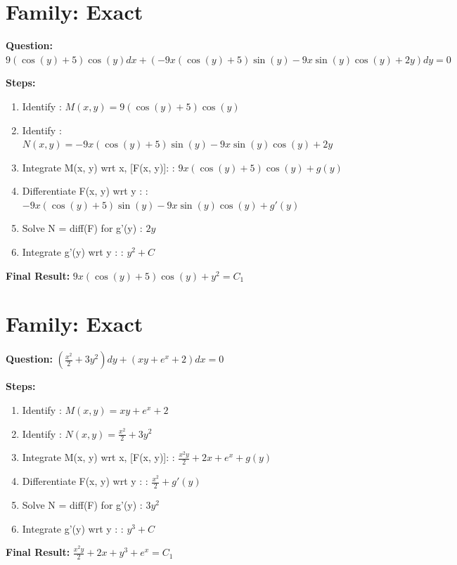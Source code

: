 \documentclass{article}
\begin{document}
\section*{Family: Exact}
\textbf{Question:} $9 \left(\cos{\left(y \right)} + 5\right) \cos{\left(y \right)} dx + \left(- 9 x \left(\cos{\left(y \right)} + 5\right) \sin{\left(y \right)} - 9 x \sin{\left(y \right)} \cos{\left(y \right)} + 2 y\right) dy = 0$

\textbf{Steps:}
\begin{enumerate}
\item Identify :  $M(x, y) = 9 \left(\cos{\left(y \right)} + 5\right) \cos{\left(y \right)}$
\item Identify :  $N(x, y) = - 9 x \left(\cos{\left(y \right)} + 5\right) \sin{\left(y \right)} - 9 x \sin{\left(y \right)} \cos{\left(y \right)} + 2 y$
\item Integrate M(x, y) wrt x, [F(x, y)]: :  $9 x \left(\cos{\left(y \right)} + 5\right) \cos{\left(y \right)} + g(y)$
\item Differentiate F(x, y) wrt y :  :  $- 9 x \left(\cos{\left(y \right)} + 5\right) \sin{\left(y \right)} - 9 x \sin{\left(y \right)} \cos{\left(y \right)} + g'(y)$
\item Solve N = diff(F) for g'(y) :  $2 y$
\item Integrate g'(y) wrt y :  :  $y^{2} + C$
\end{enumerate}
\textbf{Final Result:} $9 x \left(\cos{\left(y \right)} + 5\right) \cos{\left(y \right)} + y^{2} = C_{1}$

\section*{Family: Exact}
\textbf{Question:} $\left(\frac{x^{2}}{2} + 3 y^{2}\right) dy + \left(x y + e^{x} + 2\right) dx = 0$

\textbf{Steps:}
\begin{enumerate}
\item Identify :  $M(x, y) = x y + e^{x} + 2$
\item Identify :  $N(x, y) = \frac{x^{2}}{2} + 3 y^{2}$
\item Integrate M(x, y) wrt x, [F(x, y)]: :  $\frac{x^{2} y}{2} + 2 x + e^{x} + g(y)$
\item Differentiate F(x, y) wrt y :  :  $\frac{x^{2}}{2} + g'(y)$
\item Solve N = diff(F) for g'(y) :  $3 y^{2}$
\item Integrate g'(y) wrt y :  :  $y^{3} + C$
\end{enumerate}
\textbf{Final Result:} $\frac{x^{2} y}{2} + 2 x + y^{3} + e^{x} = C_{1}$
\end{document}
